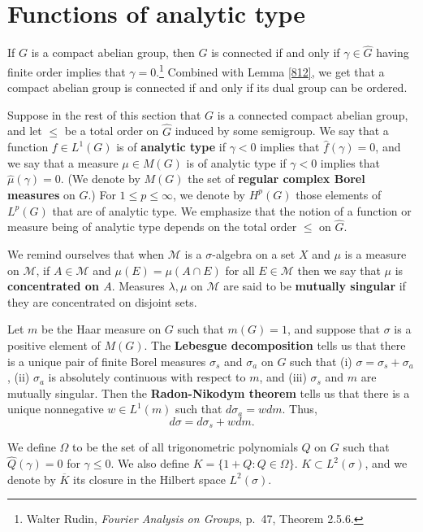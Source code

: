 \documentclass{article}
\begin{document}
\section{Functions of analytic type}
If $G$ is a compact abelian group, then $G$ is connected if and only if $\gamma \in \widehat{G}$ having finite order implies that
$\gamma=0$.\footnote{Walter Rudin, {\em Fourier Analysis on Groups}, p.~47, Theorem 2.5.6.} Combined with Lemma \ref{812},
we get that a compact abelian group is connected if and only if its dual group can be ordered.

Suppose in the rest of this section that $G$ is a connected compact abelian group, and let $\leq$ be a total order on $\widehat{G}$ induced by some
semigroup. We say that a function $f \in L^1(G)$ is of \textbf{analytic type} if $\gamma<0$ implies that $\hat{f}(\gamma)=0$, and
we say that a  measure $\mu \in M(G)$ is of analytic type if $\gamma<0$ implies that $\hat{\mu}(\gamma)=0$. (We denote
by $M(G)$ the set of \textbf{regular complex Borel measures} on $G$.)
For $1 \leq p \leq \infty$, we denote by $H^p(G)$ those elements of $L^p(G)$ that are of analytic type.
We emphasize  that the notion of a function
or measure being of analytic type depends on the total order $\leq$ on $\widehat{G}$. 

We remind ourselves that when $\mathscr{M}$ is a $\sigma$-algebra on a set $X$ and $\mu$ is a measure on $\mathscr{M}$, if
$A \in \mathscr{M}$ and $\mu(E) = \mu(A \cap E)$ for all $E \in \mathscr{M}$ then we say that $\mu$ is \textbf{concentrated on $A$}.
Measures $\lambda,\mu$ on $\mathscr{M}$ are said to be \textbf{mutually singular} if they are concentrated on disjoint sets.

Let $m$ be the Haar measure on $G$ such that $m(G)=1$, and
suppose that $\sigma$ is a positive element of $M(G)$. The \textbf{Lebesgue decomposition} tells us that there is  a unique pair
of finite Borel measures $\sigma_s$ and $\sigma_a$ on $G$ such that (i) $\sigma=\sigma_s+\sigma_a$, (ii) $\sigma_a$ is absolutely continuous with respect
to $m$, and (iii) $\sigma_s$ and $m$ are mutually singular. Then the \textbf{Radon-Nikodym theorem} tells us that there is a unique nonnegative $w \in L^1(m)$
such that $d\sigma_a = w dm$. Thus, 
\[
d\sigma = d\sigma_s + w dm.
\]

We define $\Omega$ to be the set of all trigonometric polynomials $Q$ on $G$ such that $\hat{Q}(\gamma)=0$ for $\gamma \leq 0$.
We also define $K=\{1+Q: Q \in \Omega\}$. $K \subset L^2(\sigma)$, and we denote by $\overline{K}$ its closure in the Hilbert space
$L^2(\sigma)$. 
\end{document}
